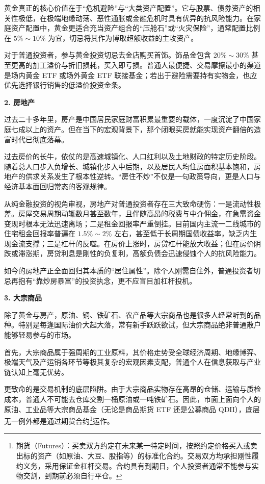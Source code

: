 \documentclass[12pt,openany]{book}
\newcommand{\subhead}[1]{%
    \par\vspace{0.5\baselineskip}%
    \noindent\textbf{#1}\par%
    \vspace{0.5\baselineskip}%
}
\begin{document}
黄金真正的核心价值在于“危机避险”与“大类资产配置”。它与股票、债券资产的相关性极低，在极端地缘动荡、恶性通胀或金融危机时具有优异的抗风险能力。在家庭资产配置中，黄金更适合充当资产组合的“压舱石”或“火灾保险”，通常配置比例在 $5\%\sim 10\%$ 为宜，切忌将其作为博取超额收益的主攻资产。

对于普通投资者，参与黄金投资切忌去金店购买首饰。饰品金包含 $20\%\sim 30\%$ 甚至更高的加工溢价与折旧损耗，买入即亏损。普通人最便捷、交易摩擦最小的渠道是场内黄金 ETF 或场外黄金 ETF 联接基金；若出于避险需要持有实物金，也应优先选择银行销售的低溢价投资金条。

\subhead{2. 房地产}

过去二十多年里，房产是中国居民家庭财富积累最重要的载体，一度沉淀了中国家庭七成以上的资产。但在当下的宏观背景下，那个闭眼买房就能实现资产翻倍的造富时代已彻底落幕。

过去房价的长牛，依仗的是高速城镇化、人口红利以及土地财政的特定历史阶段。随着总人口步入负增长、城镇化步入中后期，以及居民人均住房面积基本饱和，房地产的供求关系发生了根本性逆转。“房住不炒”不仅是一句政策导向，更是人口与经济基本面回归常态的客观规律。

从纯金融投资的视角审视，房地产对普通投资者存在三大致命硬伤：一是流动性极差。房屋交易周期动辄数月甚至数年，且伴随高昂的税费与中介佣金，在急需资金变现时根本无法迅速离场；二是租金回报率严重倒挂。目前国内主流一二线城市的住宅租金回报率普遍在 $1.5\%\sim 2\%$ 左右，甚至低于长周期国债收益率，缺乏内生现金流支撑；三是杠杆的反噬。在房价上涨时，房贷杠杆能放大收益；但在房价阴跌或滞涨期，房贷利息是刚性的负复利，高额负债会迅速侵蚀个人的抗风险能力。

如今的房地产正全面回归其本质的“居住属性”。除个人刚需自住外，普通投资者切忌再抱有“靠炒房暴富”的投资执念，更不应盲目加杠杆投机。

\subhead{3. 大宗商品}

除了黄金与房产，原油、铜、铁矿石、农产品等大宗商品也是很多人经常听到的品种。特别是每逢国际油价大起大落，常有新手跃跃欲试，但大宗商品绝非普通散户能够轻易参与的市场。

首先，大宗商品属于强周期的工业原料，其价格走势受全球经济周期、地缘博弈、极端天气及产运销各环节等极其复杂的宏观因素支配，普通个人在信息获取与产业链认知上毫无优势。

更致命的是交易机制的底层陷阱。由于大宗商品实物存在高昂的仓储、运输与质检成本，普通人不可能去仓库交割一桶原油或一吨铁矿石。因此，市面上面向个人的原油、工业品等大宗商品基金（无论是商品期货 ETF 还是公募商品 QDII），底层无一例外都是通过期货合约\footnote{期货（Futures）：买卖双方约定在未来某一特定时间，按照约定价格买入或卖出标的资产（如原油、大豆、股指等）的标准化合约。交易双方均承担刚性履约义务，采用保证金杠杆交易。合约具有到期日，个人投资者通常不能参与实物交割，到期前必须自行平仓。}运作。
\end{document}
